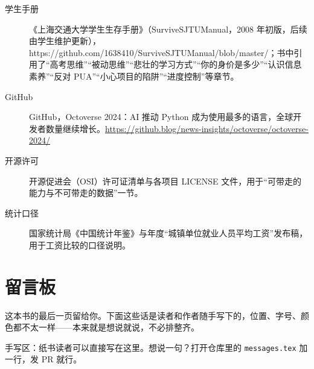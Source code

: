 \documentclass[UTF8,zihao=5,openany]{ctexbook}
\begin{document}
{\begin{description}
\item[学生手册] 《上海交通大学学生生存手册》（SurviveSJTUManual，2008 年初版，后续由学生维护更新），https://github.com/1638410/SurviveSJTUManual/blob/master/；书中引用了“高考思维”“被动思维”“悲壮的学习方式”“你的身价是多少”“认识信息素养”“反对 PUA”“小心项目的陷阱”“进度控制”等章节。
\item[GitHub] GitHub，Octoverse 2024：AI 推动 Python 成为使用最多的语言，全球开发者数量继续增长。\url{https://github.blog/news-insights/octoverse/octoverse-2024/}
\item[开源许可] 开源促进会（OSI）许可证清单与各项目 LICENSE 文件，用于“可带走的能力与不可带走的数据”一节。
\item[统计口径] 国家统计局《中国统计年鉴》与年度“城镇单位就业人员平均工资”发布稿，用于工资比较的口径说明。
\end{description}
}


\chapter{留言板}

这本书的最后一页留给你。下面这些话是读者和作者随手写下的，位置、字号、颜色都不太一样——本来就是想说就说，不必排整齐。

\vspace{0.2cm}



\vspace{0.25cm}

\begin{tcolorbox}[enhanced, blanker, borderline={0.6pt}{0pt}{ink!25,dashed},
  height=7.2cm, valign=top, left=8pt, right=8pt, top=6pt, bottom=6pt]
{\footnotesize\color{ink!55}手写区：纸书读者可以直接写在这里。想说一句？打开仓库里的 \texttt{messages.tex} 加一行，发 PR 就行。\par}
\vspace{0.5cm}
{\color{ink!20}\dotfill\par}\vspace{0.6cm}
{\color{ink!20}\dotfill\par}\vspace{0.6cm}
{\color{ink!20}\dotfill\par}\vspace{0.6cm}
{\color{ink!20}\dotfill\par}\vspace{0.6cm}
{\color{ink!20}\dotfill\par}
\end{tcolorbox}
\end{document}
